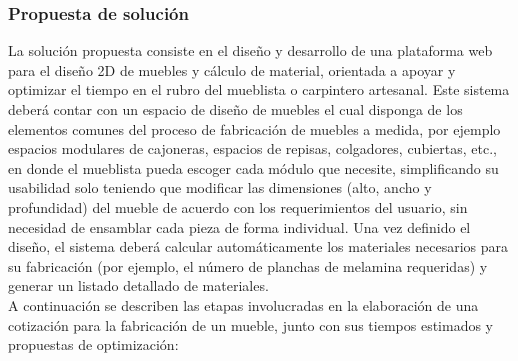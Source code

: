 \documentclass[12pt,oneside]{article}
\begin{document}
\subsubsection{Propuesta de solución}
\begingroup
La solución propuesta consiste en el diseño y desarrollo de una plataforma web para el diseño 2D de muebles y cálculo de material, orientada a apoyar y optimizar el tiempo en el rubro del mueblista o carpintero artesanal. Este sistema deberá contar con un espacio de diseño de muebles el cual disponga de los elementos comunes del proceso de fabricación de muebles a medida, por ejemplo espacios modulares de cajoneras, espacios de repisas, colgadores, cubiertas, etc., en donde el mueblista pueda escoger cada módulo que necesite, simplificando su usabilidad solo teniendo que modificar las dimensiones (alto, ancho y profundidad) del mueble de acuerdo con los requerimientos del usuario, sin necesidad de ensamblar cada pieza de forma individual. Una vez definido el diseño, el sistema deberá calcular automáticamente los materiales necesarios para su fabricación (por ejemplo, el número de planchas de melamina requeridas) y generar un listado detallado de materiales.\\

A continuación se describen las etapas involucradas en la elaboración de una cotización para la fabricación de un mueble, junto con sus tiempos estimados y propuestas de optimización:
\end{document}
